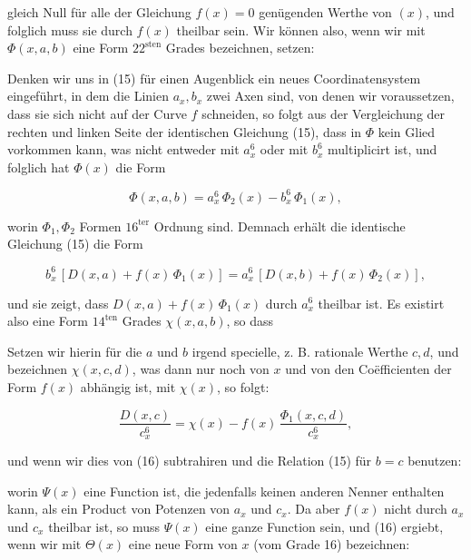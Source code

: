 gleich Null für alle der Gleichung $f(x)=0$ genügenden Werthe von $(x)$, und folglich muss sie durch $f(x)$ theilbar sein. Wir können also, wenn wir mit $\Phi(x,a,b)$ eine Form $22^{\text{sten}}$ Grades bezeichnen, setzen:


Denken wir uns in (15) für einen Augenblick ein neues Coordinatensystem eingeführt, in dem die Linien $a_x, b_x$ zwei Axen sind, von denen wir voraussetzen, dass sie sich nicht auf der Curve $f$ schneiden, so folgt aus der Vergleichung der rechten und linken Seite der identischen Gleichung (15), dass in $\Phi$ kein Glied vorkommen kann, was nicht entweder mit $a_x^6$ oder mit $b_x^6$ multiplicirt ist, und folglich hat $\Phi(x)$ die Form

\[
\Phi(x,a,b) = a_x^6\, \Phi_2(x) - b_x^6\, \Phi_1(x),
\]

worin $\Phi_1, \Phi_2$ Formen $16^{\text{ter}}$ Ordnung sind. Demnach erhält die identische Gleichung (15) die Form

\[
b_x^6\,[D(x,a) + f(x)\,\Phi_1(x)] = a_x^6\,[D(x,b) + f(x)\,\Phi_2(x)],
\]

und sie zeigt, dass $D(x,a) + f(x)\,\Phi_1(x)$ durch $a_x^6$ theilbar ist. Es existirt also eine Form $14^{\text{ten}}$ Grades $\chi(x,a,b)$, so dass


Setzen wir hierin für die $a$ und $b$ irgend specielle, z. B. rationale Werthe $c, d$, und bezeichnen $\chi(x,c,d)$, was dann nur noch von $x$ und von den Coëfficienten der Form $f(x)$ abhängig ist, mit $\chi(x)$, so folgt:

\[
\frac{D(x,c)}{c_x^6} = \chi(x) - f(x)\,\frac{\Phi_1(x,c,d)}{c_x^6},
\]

und wenn wir dies von (16) subtrahiren und die Relation (15) für $b=c$ benutzen:


worin $\Psi(x)$ eine Function ist, die jedenfalls keinen anderen Nenner enthalten kann, als ein Product von Potenzen von $a_x$ und $c_x$. Da aber $f(x)$ nicht durch $a_x$ und $c_x$ theilbar ist, so muss $\Psi(x)$ eine ganze Function sein, und (16) ergiebt, wenn wir mit $\Theta(x)$ eine neue Form von $x$ (vom Grade 16) bezeichnen:


